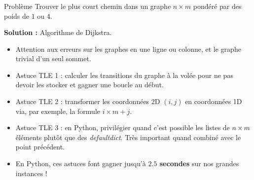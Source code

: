\begin{frame}
    \frametitle{\problemtitle}
    \begin{block}{Problème}
        Trouver le plus court chemin dans un graphe $n \times m$ pondéré par des poids de $1$ ou $4$.
    \end{block}
    \pause
    \textbf{Solution :} Algorithme de Dijkstra.
    \pause
    \begin{itemize}[<+->]
        \item Attention aux erreurs sur les graphes en une ligne ou colonne, et le graphe trivial d'un seul sommet.
        \item Astuce TLE 1 : calculer les transitions du graphe à la volée pour ne pas devoir les stocker et gagner une boucle au début.
        \item Astuce TLE 2 : transformer les coordonnées 2D $(i,j)$ en coordonnées 1D via, par exemple, la formule $i \times m + j$.
        \item Astuce TLE 3 : en Python, privilégier quand c'est possible les listes de $n \times m$ éléments plutôt que des \emph{defaultdict}. Très important quand combiné avec le point précédent.
        \item En Python, ces astuces font gagner jusqu'à \textbf{$2.5$ secondes} sur nos grandes instances !
    \end{itemize}

    \solvestats
\end{frame}